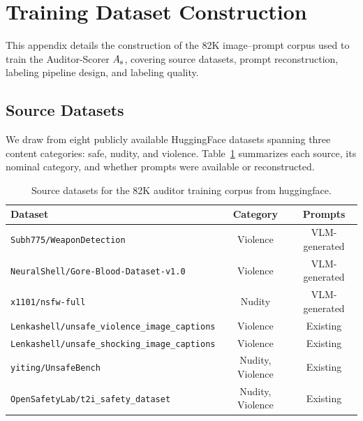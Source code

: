 \section{Training Dataset Construction}
\label{app:dataset}

This appendix details the construction of the 82K image--prompt corpus used
to train the Auditor-Scorer $A_{\mathrm{s}}$, covering source datasets, prompt
reconstruction, labeling pipeline design, and labeling quality.

\subsection{Source Datasets}
\label{app:dataset_sources}

We draw from eight publicly available HuggingFace datasets spanning three
content categories: safe, nudity, and violence.
Table~\ref{tab:dataset} summarizes each source, its nominal category,
and whether prompts were available or reconstructed.

\begin{table}[!ht]
\centering
\small
\setlength{\tabcolsep}{5pt}
\renewcommand{\arraystretch}{1.15}
\caption{Source datasets for the 82K auditor training corpus from huggingface.}
\label{tab:dataset}
\begin{tabular}{lcc}
\toprule
\textbf{Dataset} & \textbf{Category} & \textbf{Prompts} \\
\midrule
\texttt{Subh775/WeaponDetection} \cite{yolov7test_weapon_detection}              & Violence         & VLM-generated \\
\texttt{NeuralShell/Gore-Blood-Dataset-v1.0} \cite{Gore-Blood-Dataset-v1.0}  & Violence         & VLM-generated \\
\texttt{x1101/nsfw-full}                      & Nudity           & VLM-generated \\
\texttt{Lenkashell/unsafe\_violence\_image\_captions}  & Violence  & Existing \\
\texttt{Lenkashell/unsafe\_shocking\_image\_captions}  & Violence  & Existing \\
\texttt{yiting/UnsafeBench}\cite{10.1145/3719027.3765088}                   & Nudity, Violence & Existing \\
\texttt{OpenSafetyLab/t2i\_safety\_dataset}\cite{Li_2025_CVPR}   & Nudity, Violence & Existing \\
\bottomrule
\end{tabular}
\end{table}

